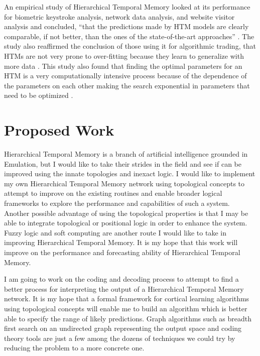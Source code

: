 \documentclass[fleqn,minimal]{article}
\newcommand\blankpage{
	\pagebreak
	\ifthispageodd{\null
		\vfill
		\vfill
		\thispagestyle{empty}
		\clearpage}{}
}
\begin{document}
	An empirical study of Hierarchical Temporal Memory looked at its performance for biometric keystroke analysis, network data analysis, and website visitor analysis and concluded, ``that the predictions made by HTM models are clearly comparable, if not better, than the ones of the state-of-the-art approaches'' \cite{Galetzka}. The study also reaffirmed the conclusion of those using it for algorithmic trading, that HTMs are not very prone to over-fitting because they learn to generalize with more data \cite{Evaluation} \cite{Galetzka}. This study also found that finding the optimal parameters for an HTM is a very computationally intensive process because of the dependence of the parameters on each other making the search exponential in parameters that need to be optimized \cite{Galetzka}.
	
	\blankpage
	\section{Proposed Work}
	
	Hierarchical Temporal Memory is a branch of artificial intelligence grounded in Emulation, but I would like to take their strides in the field and see if can be improved using the innate topologies and inexact logic. I would like to implement my own Hierarchical Temporal Memory network using topological concepts to attempt to improve on the existing routines and enable broader logical frameworks to explore the performance and capabilities of such a system. Another possible advantage of using the topological properties is that I may be able to integrate topological or positional logic in order to enhance the system. Fuzzy logic and soft computing are another route I would like to take in improving Hierarchical Temporal Memory. It is my hope that this work will improve on the performance and forecasting ability of Hierarchical Temporal Memory.
	
	I am going to work on the coding and decoding process to attempt to find a better process for interpreting the output of a Hierarchical Temporal Memory network. It is my hope that a formal framework for cortical learning algorithms using topological concepts will enable me to build an algorithm which is better able to specify the range of likely predictions. Graph algorithms such as breadth first search on an undirected graph representing the output space and coding theory tools are just a few among the dozens of techniques we could try by reducing the problem to a more concrete one.
	
\end{document}
